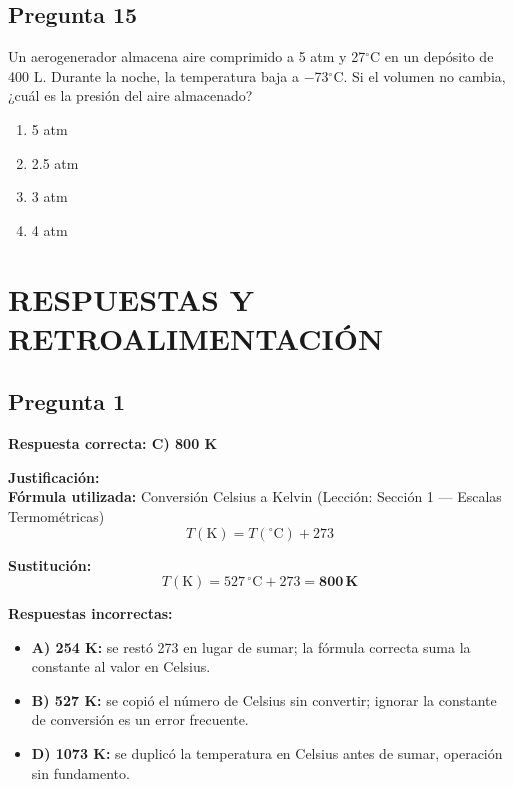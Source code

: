 \begin{preguntabox}
\subsection{Pregunta 15}
Un aerogenerador almacena aire comprimido a 5 atm y 27$^\circ$C en un depósito de 400 L. Durante la noche, la temperatura baja a $-$73$^\circ$C. Si el volumen no cambia, ¿cuál es la presión del aire almacenado?

\begin{enumerate}
    \item[A)] 5 atm
    \item[B)] 2.5 atm
    \item[C)] 3 atm
    \item[D)] 4 atm
\end{enumerate}
\end{preguntabox}


\newpage
\onecolumn
\section*{RESPUESTAS Y RETROALIMENTACIÓN}

\begin{respuestabox}
\subsection{Pregunta 1}
\textcolor{verdecorrecto}{\textbf{Respuesta correcta: C) 800 K}}

\textbf{Justificación:}\\
\textbf{Fórmula utilizada:} Conversión Celsius a Kelvin (Lección: Sección 1 --- Escalas Termométricas)
$$T(\text{K}) = T(^\circ\text{C}) + 273$$

\textbf{Sustitución:}
$$T(\text{K}) = 527\,^\circ\text{C} + 273 = \mathbf{800\,\text{K}}$$

\textbf{Respuestas incorrectas:}
\begin{itemize}
    \item \textbf{A) 254 K:} se restó 273 en lugar de sumar; la fórmula correcta suma la constante al valor en Celsius.
    \item \textbf{B) 527 K:} se copió el número de Celsius sin convertir; ignorar la constante de conversión es un error frecuente.
    \item \textbf{D) 1073 K:} se duplicó la temperatura en Celsius antes de sumar, operación sin fundamento.
\end{itemize}
\end{respuestabox}

